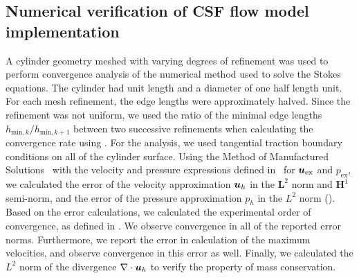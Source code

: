 \documentclass{WileyMSP-template}
\begin{document}
\subsection{Numerical verification of CSF flow model implementation}\label{subsec:numerical_verification}
A cylinder geometry meshed with varying degrees of refinement was used to
perform convergence analysis of the numerical method used to solve the Stokes equations.
The cylinder had unit length and a diameter of one half length unit.
For each mesh refinement, the edge lengths were approximately halved.
Since the refinement was not uniform, we used the ratio of the minimal
edge lengths $h_{\mathrm{min}, k}/h_{\mathrm{min}, k+1}$ between two 
successive refinements when calculating the convergence rate using
.
For the analysis, we used tangential traction boundary conditions on all
of the cylinder surface. Using the Method of Manufactured Solutions~\cite{Roache2001CodeSolutions}
with the velocity and pressure expressions defined in~
for $\bm{u}_{\mathrm{ex}}$ and $p_{\mathrm{ex}}$, we calculated the error of 
the velocity approximation $\bm{u}_h$
in the $\mathbf{L}^2$ norm and $\mathbf{H}^1$ semi-norm,
and the error of the pressure approximation $p_h$ in the $L^2$ norm ().
Based on the error calculations,
we calculated the experimental order of convergence,
as defined in .
We observe convergence in all of the reported error norms. Furthermore,
we report the error in calculation of the maximum velocities, and observe
convergence in this error as well. Finally, we calculated the $L^2$ norm of
the divergence $\nabla\cdot\bm{u}_h$ to verify the property of mass conservation.
\end{document}
